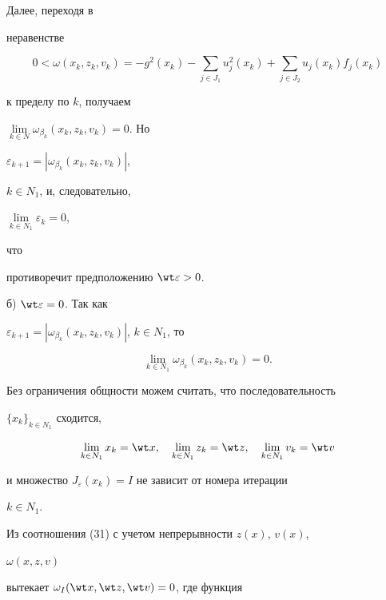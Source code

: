 \begin{pf}
Далее, переходя в 


неравенстве 


$$ 


0<\omega(x_k,z_k,v_k)=-g^2(x_k)- 


\sum_{j\in J_1}u^2_j(x_k)+ 


\sum_{j\in J_2}u_j(x_k)f_j(x_k) 


$$ 


к пределу по $k$, получаем 


$\lim\limits_{k\in N}\omega_{\beta_k}(x_k,z_k,v_k)=0$. Но 


$\varepsilon_{k+1}=|\omega_{\beta_k}(x_k,z_k,v_k)|$, 


$k\in N_1$, и, следовательно, 


$\lim\limits_{k\in{}N_1}\varepsilon_k=0$, 


что 


противоречит предположению $\wt\varepsilon>0$. 


 


б) $\wt\varepsilon=0$. Так как 


$\varepsilon_{k+1}=|\omega_{\beta_k}(x_k,z_k,v_k)|$, $k\in N_1$, то 


\begin{equation} 


\lim_{k\in N_1}\omega_{\beta_k}(x_k,z_k,v_k)=0. 


\end{equation} 


 


Без ограничения общности можем считать, что последовательность 


$\{x_k\}_{k\in N_1}$ сходится, 


$$ 


\lim_{k\in N_1}x_k=\wt x,\quad 


\lim_{k\in N_1}z_k=\wt z,\quad 


\lim_{k\in N_1}v_k=\wt v 


$$ 


и множество $J_\varepsilon(x_k)=I$ не зависит от номера итерации 


$k\in N_1$. 


 


Из соотношения (31) с учетом непрерывности $z(x)$, $v(x)$, 


$\omega(x,z,v)$ 


вытекает $\omega_I(\wt x,\wt z,\wt v)=0$, где функция 



\end{pf}
